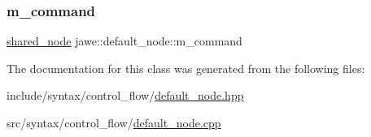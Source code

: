 \subsubsection{\texorpdfstring{m\+\_\+command}{m\_command}}
{\footnotesize\ttfamily \hyperlink{namespacejawe_a3f307481d921b6cbb50cc8511fc2b544}{shared\+\_\+node} jawe\+::default\+\_\+node\+::m\+\_\+command\hspace{0.3cm}{\ttfamily [private]}}



The documentation for this class was generated from the following files\+:\begin{DoxyCompactItemize}
\item 
include/syntax/control\+\_\+flow/\hyperlink{default__node_8hpp}{default\+\_\+node.\+hpp}\item 
src/syntax/control\+\_\+flow/\hyperlink{default__node_8cpp}{default\+\_\+node.\+cpp}\end{DoxyCompactItemize}
